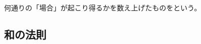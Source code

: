 \documentclass[../../math-imaging]{subfiles}
\begin{document}

何通りの「場合」が起こり得るかを数え上げたものをという。

\subsection{和の法則}
\end{document}
